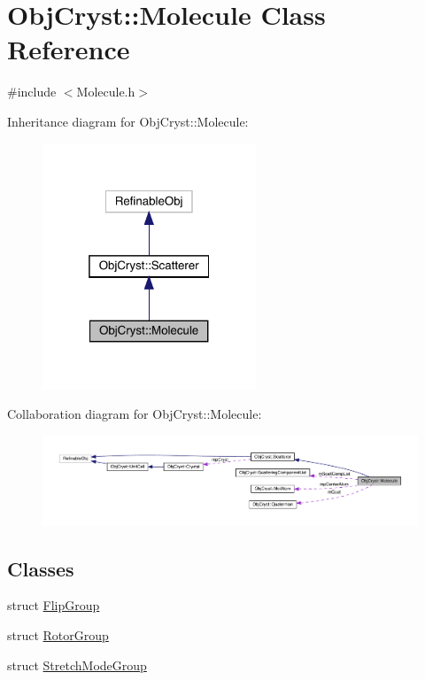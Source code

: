 \hypertarget{class_obj_cryst_1_1_molecule}{}\section{Obj\+Cryst\+::Molecule Class Reference}
\label{class_obj_cryst_1_1_molecule}


{\ttfamily \#include $<$Molecule.\+h$>$}



Inheritance diagram for Obj\+Cryst\+::Molecule\+:
\nopagebreak
\begin{figure}[H]
\begin{center}
\leavevmode
\includegraphics[width=181pt]{class_obj_cryst_1_1_molecule__inherit__graph}
\end{center}
\end{figure}


Collaboration diagram for Obj\+Cryst\+::Molecule\+:
\nopagebreak
\begin{figure}[H]
\begin{center}
\leavevmode
\includegraphics[width=350pt]{class_obj_cryst_1_1_molecule__coll__graph}
\end{center}
\end{figure}
\subsection*{Classes}
\begin{DoxyCompactItemize}
\item 
struct \mbox{\hyperlink{struct_obj_cryst_1_1_molecule_1_1_flip_group}{Flip\+Group}}
\item 
struct \mbox{\hyperlink{struct_obj_cryst_1_1_molecule_1_1_rotor_group}{Rotor\+Group}}
\item 
struct \mbox{\hyperlink{struct_obj_cryst_1_1_molecule_1_1_stretch_mode_group}{Stretch\+Mode\+Group}}
\end{DoxyCompactItemize}
